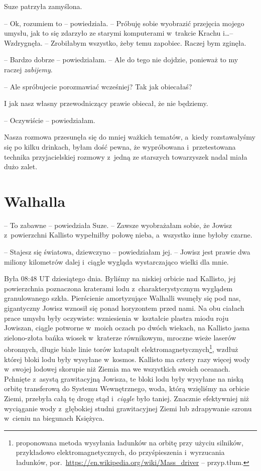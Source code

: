\documentclass[oneside,polish,11pt,sfheadings]{mwbk}
\begin{document}
Suze patrzyła zamyślona. 

-- Ok, rozumiem to -- powiedziała. -- Próbuję
sobie wyobrazić przejęcia mojego umysłu, jak to się zdarzyło ze starymi
komputerami w~trakcie Krachu i\ldots  -- Wzdrygnęła. -- Zrobiłabym wszystko,
żeby temu zapobiec. Raczej bym zginęła.

-- Bardzo dobrze -- powiedziałam. -- Ale do tego nie dojdzie, ponieważ to
my raczej \textit{zabijemy}.

-- Ale spróbujecie porozmawiać wcześniej? Tak jak obiecałaś?

I jak nasz własny przewodniczący prawie obiecał, że nie będziemy.

-- Oczywiście -- powiedziałam.

Nasza rozmowa przesunęła się do mniej ważkich tematów, a~kiedy
rozstawałyśmy się po kilku drinkach, byłam dość pewna, że wypróbowana i~przetestowana technika przyjacielskiej rozmowy z~jedną ze starszych
towarzyszek nadal miała dużo zalet.

\chapter{Walhalla}

-- To zabawne -- powiedziała Suze. -- Zawsze wyobrażałam sobie, że Jowisz z~powierzchni Kallisto wypełniłby połowę nieba, a~wszystko inne byłoby
czarne.

-- Stajesz się światowa, dziewczyno -- powiedziałam jej. -- Jowisz jest
prawie dwa miliony kilometrów dalej i~ciągle wygląda wystarczająco
wielki dla mnie.

Była 08:48 UT dziesiątego dnia. Byliśmy na niskiej orbicie nad Kallisto,
jej powierzchnia poznaczona kraterami lodu z~charakterystycznym wyglądem
granulowanego szkła. Pierścienie amortyzujące Walhalli wsunęły się pod
nas, gigantyczny Jowisz wznosił się ponad horyzontem przed nami. Na obu
ciałach prace umysłu były oczywiste: wzniesienia w~kształcie plastra
miodu roju Jowiszan, ciągle potworne w~moich oczach po dwóch wiekach, na
Kallisto jasna zielono-złota bańka wiosek w~kraterze równikowym, mroczne
wieże laserów obronnych, długie białe linie torów katapult
elektromagnetycznych\footnote{ proponowana metoda wysyłania ładunków na orbitę
przy użyciu silników, przykładowo elektromagnetycznych, do
przyśpieszenia i~wyrzucania ładunków,
por.~\url{https://en.wikipedia.org/wiki/Mass\_driver} -- przyp.tłum.}, wzdłuż której bloki lodu były wysyłane w~kosmos. Kallisto
ma cztery razy więcej wody w~swojej lodowej skorupie niż Ziemia ma we
wszystkich swoich oceanach. Pchnięte z~asystą grawitacyjną Jowisza, te
bloki lodu były wysyłane na niską orbitę transferową do Systemu
Wewnętrznego, woda, którą wzięliśmy na orbicie Ziemi, przebyła całą tę
drogę stąd i~\textit{ciągle} było taniej. Znacznie efektywniej niż
wyciąganie wody z~głębokiej studni grawitacyjnej Ziemi lub zdrapywanie
szronu w~cieniu na biegunach Księżyca.
\end{document}
